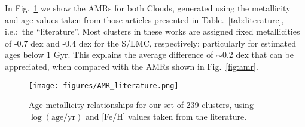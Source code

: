 \documentclass{aa}
\begin{document}
\begin{appendix}
In Fig.~\ref{fig:amr_lit} we show the AMRs for both Clouds, generated using the
metallicity and age values taken from those articles presented in
Table.~\ref{tab:literature}, i.e.:~the ``literature''.
Most clusters in these works are assigned fixed metallicities of -0.7 dex and
-0.4 dex for the S/LMC, respectively; particularly for estimated ages below 1
Gyr. This explains the average difference of ${\sim}0.2$ dex that can be
appreciated, when compared with the AMRs shown in Fig.~\ref{fig:amr}.

\begin{figure}
\centering
\texttt{[image: figures/AMR\_literature.png]}
\caption{Age-metallicity relationships for our set of 239 clusters, using
$\log\mathrm{(age/yr)}$ and [Fe/H] values taken from the literature.}
\label{fig:amr_lit}
\end{figure}

\end{appendix} 
\end{document}
